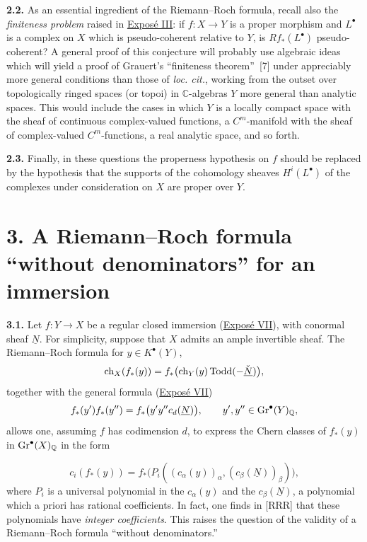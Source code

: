 \textbf{2.2.} As an essential ingredient of the Riemann--Roch formula,
recall also the \emph{finiteness problem} raised in \hyperlink{sga6.e03.expose}{Expos\'e III}: if
$f:X\to Y$ is a proper morphism and $L^\bullet$ is a complex on $X$
which is pseudo-coherent relative to $Y$, is $Rf_*(L^\bullet)$
pseudo-coherent? A general proof of this conjecture will probably use
algebraic ideas which will yield a proof of Grauert's ``finiteness
theorem''~[7] under appreciably more general conditions than those of
\emph{loc. cit.}, working from the outset over topologically ringed
spaces (or topoi) in $\mathbb C$-algebras $Y$ more general than analytic
spaces. This would include the cases in which $Y$ is a locally compact
space with the sheaf of continuous complex-valued functions, a
$C^m$-manifold with the sheaf of complex-valued $C^m$-functions, a real
analytic space, and so forth.

\textbf{2.3.} Finally, in these questions the properness hypothesis on $f$ should be replaced by the hypothesis that the supports of the cohomology sheaves $H^i(L^\bullet)$ of the complexes under consideration on $X$ are proper over $Y$.

\section*{3. A Riemann--Roch formula ``without denominators'' for an immersion}

\textbf{3.1.} Let $f:Y\to X$ be a regular closed immersion (\hyperlink{sga6.e07.expose}{Expos\'e VII}), with conormal sheaf $\underline N$. For simplicity, suppose that $X$ admits an ample invertible sheaf. The Riemann--Roch formula for $y\in K^\bullet(Y)$,
\[
  \operatorname{ch}_X(f_*(y))
  =f_*\bigl(\operatorname{ch}_Y(y)\operatorname{Todd}(-\check{\underline N})\bigr),
\]
together with the general formula (\hyperlink{sga6.e07.expose}{Expos\'e VII})
\[
  f_*(y')f_*(y'')
  =f_*\bigl(y'y''c_d(\underline N)\bigr),
  \qquad y',y''\in\operatorname{Gr}^\bullet(Y)_{\mathbb Q},
\]
allows one, assuming $f$ has codimension $d$, to express the Chern classes of $f_*(y)$ in $\operatorname{Gr}^\bullet(X)_{\mathbb Q}$ in the form

\begin{equation}\tag{3.1}
  c_i(f_*(y))
  =f_*\bigl(P_i((c_\alpha(y))_\alpha,(c_\beta(\underline N))_\beta)\bigr),
\end{equation}
where $P_i$ is a universal polynomial in the $c_\alpha(y)$ and the $c_\beta(\underline N)$, a polynomial which a priori has rational coefficients. In fact, one finds in [RRR] that these polynomials have \emph{integer coefficients}. This raises the question of the validity of a Riemann--Roch formula ``without denominators.''

